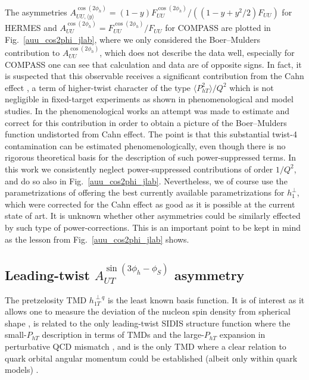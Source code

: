 \documentclass[a4paper,11pt]{article}
\newcommand{\blue}[1]{{\color{blue} #1}}
\newcommand{\la}{\langle}
\newcommand{\ra}{\rangle}
\newcommand{\ps}[1]{\blue{#1}}
\def\Phperp{P_{hT}}
\begin{document}
The asymmetries  $A_{UU, \langle y\rangle}^{\cos(2\phi_h)}=(1-y)F_{UU}^{\cos(2\phi_h)}/((1-y + y^2/2)F_{UU})$
for HERMES \cite{Airapetian:2012yg} and $A_{UU}^{\cos(2\phi_h)}=F_{UU}^{\cos(2\phi_h)}/F_{UU}$ for COMPASS \cite{Adolph:2014pwc}
are plotted in Fig.~\ref{auu_cos2phi_jlab}, where we only considered the
Boer--Mulders contribution to $A_{UU}^{\cos(2\phi_h)}$, which does not describe
the data well, especially for COMPASS one can see that calculation and
data are of opposite signs. In fact, it is suspected that this observable
receives a significant contribution from the Cahn effect \cite{Cahn:1978se},
a term of higher-twist character of the type $\la\Phperp^2\ra/Q^2$ which
is not negligible in fixed-target experiments \ps{as shown in
phenomenological \cite{Schweitzer:2010tt} and model \cite{Cao:2018qqf} studies}.
\ps{In the phenomenological works
\cite{Barone:2009hw,Barone:2010gk,Barone:2015ksa} an attempt was
made to estimate and correct for this contribution in order}
to obtain a picture of the Boer--Mulders function undistorted
from Cahn effect. The point is that this substantial twist-4 contamination
can be estimated phenomenologically, even though there is no rigorous
theoretical basis for the description of such power-suppressed terms.
In this work we consistently neglect power-suppressed contributions of
order $1/Q^2$, and do so also in Fig.~\ref{auu_cos2phi_jlab}.
Nevertheless, we of course use the parametrizations of
\cite{Barone:2009hw,Barone:2010gk,Barone:2015ksa} offering
the best currently available parametrizations for $h_1^{\perp}$,
which were corrected for the Cahn effect as good as it is possible at
the current state of art. It is unknown whether other asymmetries
could be similarly effected by such type of power-corrections.
This is an important point to be kept in mind as the lesson
from Fig.~\ref{auu_cos2phi_jlab} shows.



\subsection{\boldmath Leading-twist $A_{UT}^{\sin(3\phi_h-\phi_S)}$  asymmetry}
\label{Sec-5.6:pretzel-basis}

The pretzelosity TMD $h_{1T}^{\perp q}$ is the least known basis
function. It is of interest as it allows one to measure the deviation
of the nucleon spin density from spherical shape \cite{Miller:2007ae},
is related to the only leading-twist SIDIS structure function where the
small-$P_{hT}$ description in terms of TMDs and the large-$P_{hT}$ expansion
in perturbative QCD mismatch \cite{Bacchetta:2008xw}, and is the only TMD
where a clear relation to quark orbital angular momentum
could be established (albeit only within quark models)
\cite{Avakian:2008dz,She:2009jq,Avakian:2010br,Lorce:2011kn}.
\end{document}
